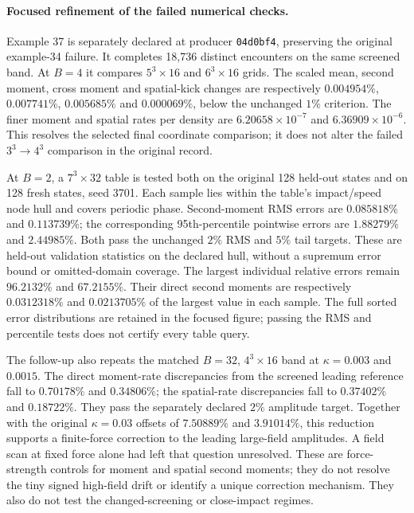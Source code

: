 \documentclass[11pt,letterpaper]{article}
\begin{document}
\paragraph{Focused refinement of the failed numerical checks.}
Example 37 is separately declared at producer \texttt{04d0bf4}, preserving
the original example-34 failure. It completes 18,736 distinct encounters
on the same screened band. At $B=4$ it compares $5^3\times16$ and
$6^3\times16$ grids. The scaled mean, second moment, cross moment and
spatial-kick changes are respectively $0.004954\%$, $0.007741\%$,
$0.005685\%$ and $0.000069\%$, below the unchanged $1\%$ criterion.
The finer moment and spatial rates per density are
$6.20658\times10^{-7}$ and $6.36909\times10^{-6}$. This resolves the
selected final coordinate comparison; it does not alter the failed
$3^3\to4^3$ comparison in the original record.

At $B=2$, a $7^3\times32$ table is tested both on the original 128
held-out states and on 128 fresh states, seed 3701. Each sample lies
within the table's impact/speed node hull and covers periodic phase.
Second-moment RMS errors are $0.085818\%$ and $0.113739\%$; the
corresponding 95th-percentile pointwise errors are $1.88279\%$ and
$2.44985\%$. Both pass the unchanged $2\%$ RMS and $5\%$ tail
targets. These are held-out validation statistics on the declared hull,
without a supremum error bound or omitted-domain coverage.
The largest individual relative errors remain $96.2132\%$ and
$67.2155\%$. Their direct second moments are respectively
$0.0312318\%$ and $0.0213705\%$ of the largest value in each sample.
The full sorted error distributions are retained in the focused figure;
passing the RMS and percentile tests does not certify every table query.

The follow-up also repeats the matched $B=32$, $4^3\times16$ band at
$\kappa=0.003$ and $0.0015$. The direct moment-rate discrepancies from
the screened leading reference fall to $0.70178\%$ and $0.34806\%$;
the spatial-rate discrepancies fall to $0.37402\%$ and $0.18722\%$.
They pass the separately declared $2\%$ amplitude target. Together with
the original $\kappa=0.03$ offsets of $7.50889\%$ and $3.91014\%$,
this reduction supports a finite-force correction to the leading
large-field amplitudes. A field scan at fixed force alone had left that
question unresolved. These are force-strength controls for moment and
spatial second moments; they do not resolve the tiny signed high-field
drift or identify a unique correction mechanism. They also do not test
the changed-screening or close-impact regimes.
\end{document}
